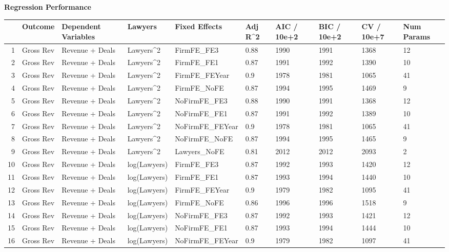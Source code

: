 \documentclass{article}
\begin{document}
\newpage
{\large \textbf{Regression Performance} }%
\begin{table}[H]
\centering
\begin{tabular}{rlllllllll}
  \hline
 & Outcome & Dependent Variables & Lawyers & Fixed Effects & Adj R^2 & AIC / 10e+2 & BIC / 10e+2 & CV / 10e+7 & Num Params \\ 
  \hline
1 & Gross Rev & Revenue + Deals & Lawyers^2 & FirmFE\_FE3 & 0.88 & 1990 & 1991 & 1368 & 12 \\ 
  2 & Gross Rev & Revenue + Deals & Lawyers^2 & FirmFE\_FE1 & 0.87 & 1991 & 1992 & 1390 & 10 \\ 
  3 & Gross Rev & Revenue + Deals & Lawyers^2 & FirmFE\_FEYear & 0.9 & 1978 & 1981 & 1065 & 41 \\ 
  4 & Gross Rev & Revenue + Deals & Lawyers^2 & FirmFE\_NoFE & 0.87 & 1994 & 1995 & 1469 & 9 \\ 
  5 & Gross Rev & Revenue + Deals & Lawyers^2 & NoFirmFE\_FE3 & 0.88 & 1990 & 1991 & 1368 & 12 \\ 
  6 & Gross Rev & Revenue + Deals & Lawyers^2 & NoFirmFE\_FE1 & 0.87 & 1991 & 1992 & 1389 & 10 \\ 
  7 & Gross Rev & Revenue + Deals & Lawyers^2 & NoFirmFE\_FEYear & 0.9 & 1978 & 1981 & 1065 & 41 \\ 
  8 & Gross Rev & Revenue + Deals & Lawyers^2 & NoFirmFE\_NoFE & 0.87 & 1994 & 1995 & 1465 & 9 \\ 
  9 & Gross Rev & Revenue + Deals & Lawyers^2 & Lawyers\_NoFE & 0.81 & 2012 & 2012 & 2093 & 2 \\ 
  10 & Gross Rev & Revenue + Deals & log(Lawyers) & FirmFE\_FE3 & 0.87 & 1992 & 1993 & 1420 & 12 \\ 
  11 & Gross Rev & Revenue + Deals & log(Lawyers) & FirmFE\_FE1 & 0.87 & 1993 & 1994 & 1440 & 10 \\ 
  12 & Gross Rev & Revenue + Deals & log(Lawyers) & FirmFE\_FEYear & 0.9 & 1979 & 1982 & 1095 & 41 \\ 
  13 & Gross Rev & Revenue + Deals & log(Lawyers) & FirmFE\_NoFE & 0.86 & 1996 & 1996 & 1518 & 9 \\ 
  14 & Gross Rev & Revenue + Deals & log(Lawyers) & NoFirmFE\_FE3 & 0.87 & 1992 & 1993 & 1421 & 12 \\ 
  15 & Gross Rev & Revenue + Deals & log(Lawyers) & NoFirmFE\_FE1 & 0.87 & 1993 & 1994 & 1444 & 10 \\ 
  16 & Gross Rev & Revenue + Deals & log(Lawyers) & NoFirmFE\_FEYear & 0.9 & 1979 & 1982 & 1097 & 41 \\ 

\end{tabular}
\end{table}
\end{document}
